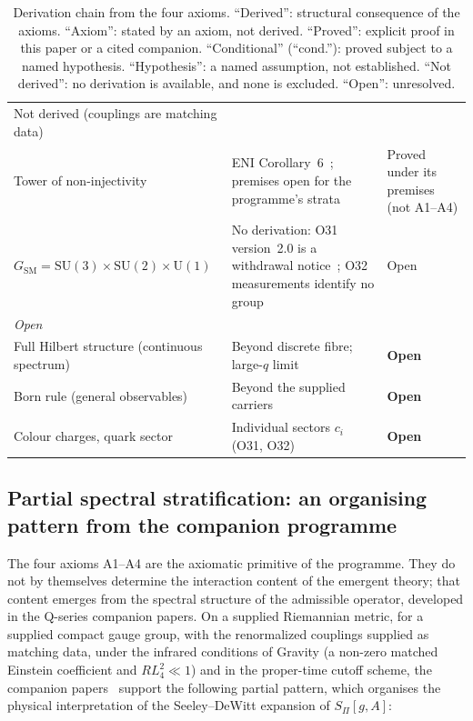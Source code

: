 \documentclass[11pt,a4paper]{article}
\begin{document}
\begin{table}[p]
{\begin{tabular}{p{4.6cm}p{5.4cm}p{4.2cm}}
      Not derived (couplings are matching data) \\
      Tower of non-injectivity &
      ENI Corollary~6~\cite{Beau2026l}; premises open for the programme's strata &
      Proved under its premises (not A1--A4) \\
      $G_{\mathrm{SM}} =
      \mathrm{SU}(3)\times\mathrm{SU}(2)\times\mathrm{U}(1)$ &
      No derivation: O31 version~2.0 is a withdrawal notice~\cite{Beau2026a35};
      O32 measurements identify no group~\cite{Beau2026a36} &
      Open \\
      \midrule
      \multicolumn{3}{l}{\textit{Open}} \\
      \midrule
      Full Hilbert structure (continuous spectrum) &
      Beyond discrete fibre; large-$q$ limit &
      \textbf{Open} \\
      Born rule (general observables) &
      Beyond the supplied carriers &
      \textbf{Open} \\
      Colour charges, quark sector &
      Individual sectors $c_i$ (O31, O32) &
      \textbf{Open} \\
      \bottomrule
    \end{tabular}}
    \caption{\footnotesize Derivation chain from the four axioms.
    ``Derived'': structural consequence of the axioms.
    ``Axiom'': stated by an axiom, not derived.
    ``Proved'': explicit proof in this paper or a cited companion.
    ``Conditional'' (``cond.''): proved subject to a named hypothesis.
    ``Hypothesis'': a named assumption, not established.
    ``Not derived'': no derivation is available, and none is excluded.
    ``Open'': unresolved.}
    \label{tab:derived}
  \end{table}

  \subsection*{Partial spectral stratification: an organising pattern from the companion programme}
    \label{ssec:spectral-stratification}

    The four axioms A1--A4 are the axiomatic primitive of the programme.
    They do not by themselves determine the interaction content of the emergent theory;
    that content emerges from the spectral structure of the admissible operator,
    developed in the Q-series companion papers.
    On a supplied Riemannian metric, for a supplied compact gauge group, with the renormalized couplings
    supplied as matching data, under the infrared conditions of Gravity (a non-zero matched Einstein
    coefficient and $R L_4^2 \ll 1$) and in the proper-time cutoff scheme,
    the companion papers~\cite{Beau2026h,Beau2026q12,Beau2026q13} support
    the following partial pattern, which organises the physical interpretation
    of the Seeley--DeWitt expansion of $S_\Pi[g,A]$:
\end{document}
